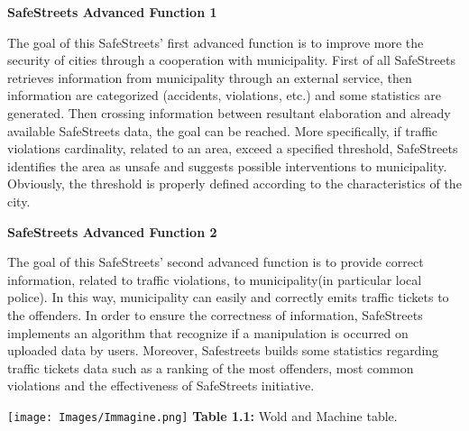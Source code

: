 \documentclass[12pt]{article}
\begin{document}
\begin{flushleft}
\textbf{SafeStreets Advanced Function 1}
\end{flushleft}
\vspace{3mm}
The goal of this SafeStreets’ first advanced function is to improve more the security of cities through a cooperation with municipality. First of all SafeStreets retrieves information from municipality through an external service, then information are categorized (accidents, violations, etc.) and some statistics are generated. Then crossing information between resultant elaboration and already available SafeStreets data, the goal can be reached. More specifically, if traffic violations cardinality, related to an area, exceed a specified threshold, SafeStreets identifies the area as unsafe and suggests possible interventions to municipality. Obviously, the threshold is properly defined according to the characteristics of the city.

\newpage

\begin{flushleft}
\textbf{SafeStreets Advanced Function 2}
\end{flushleft}
\vspace{3mm}
The goal of this SafeStreets’ second advanced function is to provide correct information, related to traffic violations, to municipality(in particular local police). In this way, municipality can easily and correctly emits traffic tickets to the offenders. In order to ensure the correctness of information, SafeStreets implements an algorithm that recognize if a manipulation is occurred on uploaded data by users. Moreover, Safestreets builds some statistics regarding traffic tickets data such as a ranking of the most offenders, most common violations and the effectiveness of SafeStreets initiative.
\vspace{4mm}
\begin{center}
	
	 	\vspace{4mm}
	 	
 	 	\texttt{[image: Images/Immagine.png]}
 	 	\textbf{Table 1.1:} Wold and Machine table.
	\end{center}


\newpage
\end{document}
